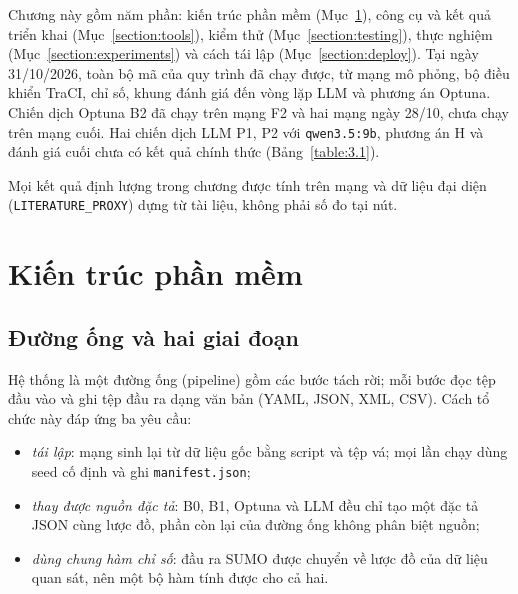 \documentclass[../DoAn.tex]{subfiles}
\begin{document}

Chương này gồm năm phần: kiến trúc phần mềm (Mục~\ref{section:architecture}), công cụ và kết quả triển khai (Mục~\ref{section:tools}), kiểm thử (Mục~\ref{section:testing}), thực nghiệm (Mục~\ref{section:experiments}) và cách tái lập (Mục~\ref{section:deploy}). Tại ngày 31/10/2026, toàn bộ mã của quy trình đã chạy được, từ mạng mô phỏng, bộ điều khiển TraCI, chỉ số, khung đánh giá đến vòng lặp LLM và phương án Optuna. Chiến dịch Optuna B2 đã chạy trên mạng F2 và hai mạng ngày 28/10, chưa chạy trên mạng cuối. Hai chiến dịch LLM P1, P2 với \texttt{qwen3.5:9b}, phương án H và đánh giá cuối chưa có kết quả chính thức (Bảng~\ref{table:3.1}).

Mọi kết quả định lượng trong chương được tính trên mạng và dữ liệu đại diện (\texttt{LITERATURE\_PROXY}) dựng từ tài liệu, không phải số đo tại nút.

\section{Kiến trúc phần mềm}
\label{section:architecture}

\subsection{Đường ống và hai giai đoạn}

Hệ thống là một đường ống (pipeline) gồm các bước tách rời; mỗi bước đọc tệp đầu vào và ghi tệp đầu ra dạng văn bản (YAML, JSON, XML, CSV). Cách tổ chức này đáp ứng ba yêu cầu:
\begin{itemize}
    \item \emph{tái lập}: mạng sinh lại từ dữ liệu gốc bằng script và tệp vá; mọi lần chạy dùng seed cố định và ghi \texttt{manifest.json};
    \item \emph{thay được nguồn đặc tả}: B0, B1, Optuna và LLM đều chỉ tạo một đặc tả JSON cùng lược đồ, phần còn lại của đường ống không phân biệt nguồn;
    \item \emph{dùng chung hàm chỉ số}: đầu ra SUMO được chuyển về lược đồ của dữ liệu quan sát, nên một bộ hàm tính được cho cả hai.
\end{itemize}
\end{document}
